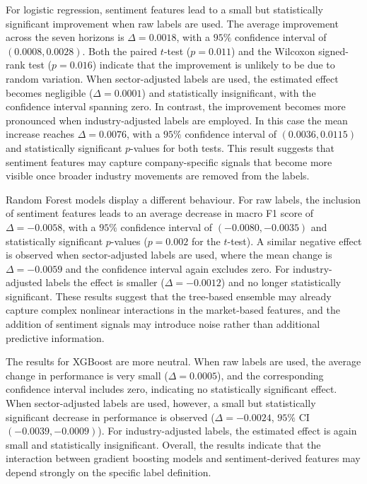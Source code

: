 For logistic regression, sentiment features lead to a small but statistically significant improvement when raw labels are used. The average improvement across the seven horizons is $\Delta = 0.0018$, with a $95\%$ confidence interval of $(0.0008, 0.0028)$. Both the paired $t$-test ($p = 0.011$) and the Wilcoxon signed-rank test ($p = 0.016$) indicate that the improvement is unlikely to be due to random variation. When sector-adjusted labels are used, the estimated effect becomes negligible ($\Delta = 0.0001$) and statistically insignificant, with the confidence interval spanning zero. In contrast, the improvement becomes more pronounced when industry-adjusted labels are employed. In this case the mean increase reaches $\Delta = 0.0076$, with a $95\%$ confidence interval of $(0.0036, 0.0115)$ and statistically significant $p$-values for both tests. This result suggests that sentiment features may capture company-specific signals that become more visible once broader industry movements are removed from the labels.

Random Forest models display a different behaviour. For raw labels, the inclusion of sentiment features leads to an average decrease in macro F1 score of $\Delta = -0.0058$, with a $95\%$ confidence interval of $(-0.0080, -0.0035)$ and statistically significant $p$-values ($p = 0.002$ for the $t$-test). A similar negative effect is observed when sector-adjusted labels are used, where the mean change is $\Delta = -0.0059$ and the confidence interval again excludes zero. For industry-adjusted labels the effect is smaller ($\Delta = -0.0012$) and no longer statistically significant. These results suggest that the tree-based ensemble may already capture complex nonlinear interactions in the market-based features, and the addition of sentiment signals may introduce noise rather than additional predictive information.

The results for XGBoost are more neutral. When raw labels are used, the average change in performance is very small ($\Delta = 0.0005$), and the corresponding confidence interval includes zero, indicating no statistically significant effect. When sector-adjusted labels are used, however, a small but statistically significant decrease in performance is observed ($\Delta = -0.0024$, $95\%$ CI $(-0.0039, -0.0009)$). For industry-adjusted labels, the estimated effect is again small and statistically insignificant. Overall, the results indicate that the interaction between gradient boosting models and sentiment-derived features may depend strongly on the specific label definition.

